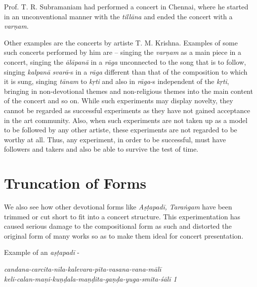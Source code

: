 Prof. T. R. Subramaniam had performed a concert in Chennai, where he started in an unconventional manner with the \textit{tillāna} and ended the concert with a \textit{varṇam}.

Other examples are the concerts by artiste T. M. Krishna. Examples of some such concerts performed by him are – singing the \textit{varṇam} as a main piece in a concert, singing the \textit{ālāpanā} in a \textit{rāga} unconnected to the song that is to follow, singing \textit{kalpanā svarā}-s in a \textit{rāga} different than that of the composition to which it is sung, singing \textit{tānam} to \textit{kṛti} and also in \textit{rāga}-s independent of the \textit{kṛti}, bringing in non-devotional themes and non-religious themes into the main content of the concert and so on. While such experiments may display novelty, they cannot be regarded as successful experiments as they have not gained acceptance in the art community. Also, when such experiments are not taken up as a model to be followed by any other artiste, these experiments are not regarded to be worthy at all. Thus, any experiment, in order to be successful, must have followers and takers and also be able to survive the test of time.


\section*{Truncation of Forms}

We also see how other devotional forms like \textit{Aṣṭapadī, Taraṅgam} have been trimmed or cut short to fit into a concert structure. This experimentation has caused serious damage to the compositional form as such and distorted the original form of many works so as to make them ideal for concert presentation.

Example of an \textit{aṣṭapadī} -

\begin{myquote}
\textit{candana-carcita-nīla-kalevara-pīta-vasana-vana-mālī }\\ \textit{keli-calan-maṇi-kuṇḍala-maṇḍita-gaṇḍa-yuga-smita-śālī 1 }
\end{myquote}


